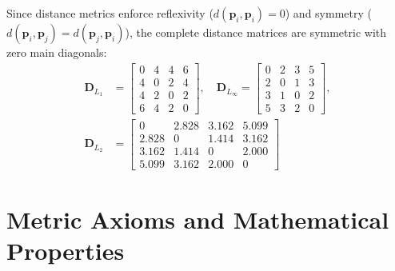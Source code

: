 Since distance metrics enforce reflexivity ($d(\mathbf{p}_i, \mathbf{p}_i) = 0$) and symmetry ($d(\mathbf{p}_i, \mathbf{p}_j) = d(\mathbf{p}_j, \mathbf{p}_i)$), the complete distance matrices are symmetric with zero main diagonals:
\begin{align}
\mathbf{D}_{L_1} &= \begin{bmatrix}
0 & 4 & 4 & 6 \\
4 & 0 & 2 & 4 \\
4 & 2 & 0 & 2 \\
6 & 4 & 2 & 0
\end{bmatrix}, \quad
\mathbf{D}_{L_\infty} = \begin{bmatrix}
0 & 2 & 3 & 5 \\
2 & 0 & 1 & 3 \\
3 & 1 & 0 & 2 \\
5 & 3 & 2 & 0
\end{bmatrix}, \\[6pt]
\mathbf{D}_{L_2} &= \begin{bmatrix}
0 & 2.828 & 3.162 & 5.099 \\
2.828 & 0 & 1.414 & 3.162 \\
3.162 & 1.414 & 0 & 2.000 \\
5.099 & 3.162 & 2.000 & 0
\end{bmatrix}
\end{align}

\section{Metric Axioms and Mathematical Properties}
\label{sec:dm-metric-axioms}

